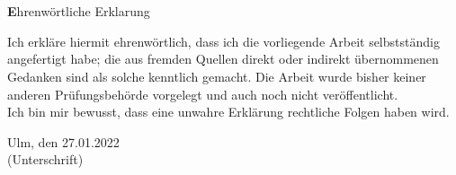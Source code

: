 \thispagestyle{empty}

\chapter*{}
\begin{center}
{\large\textbf Ehrenwörtliche Erklarung}
\end{center}

\vspace*{1cm}

\noindent
Ich erkläre hiermit ehrenwörtlich, dass ich die vorliegende Arbeit
selbstständig angefertigt habe; die aus fremden Quellen direkt oder indirekt 
übernommenen Gedanken sind als solche kenntlich gemacht. Die Arbeit wurde 
bisher keiner anderen Prüfungsbehörde vorgelegt und auch noch nicht 
veröffentlicht.\\

\noindent
Ich bin mir bewusst, dass eine unwahre Erklärung rechtliche Folgen haben wird.

\vspace{2cm}



\noindent Ulm, den 27.01.2022 \hspace{4cm}\hrulefill\\
\vspace*{0.5cm}
\hspace*{11.0cm} (Unterschrift)



